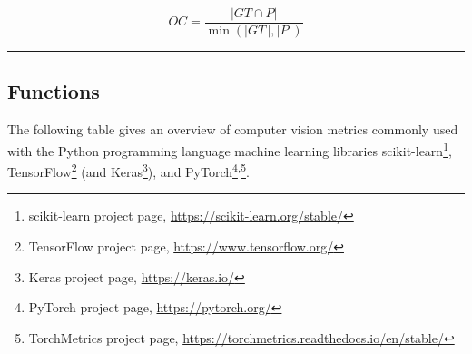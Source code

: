 \documentclass{article}
\begin{document}
\begin{equation}
	\textit{OC} = \dfrac{|\textit{GT} \cap P|}{\min(|\textit{GT}\,|, |P|)}
%
	\label{equation:OC}
\end{equation}

\hrule




\clearpage
\subsection*{Functions}

The following table gives an overview of computer vision metrics commonly used with the Python programming language machine learning libraries scikit-learn\footnote{scikit-learn project page, \url{https://scikit-learn.org/stable/}}, TensorFlow\footnote{TensorFlow project page, \url{https://www.tensorflow.org/}} (and Keras\footnote{Keras project page, \url{https://keras.io/}}), and PyTorch\footnote{PyTorch project page, \url{https://pytorch.org/}}\textsuperscript{,}\footnote{TorchMetrics project page, \url{https://torchmetrics.readthedocs.io/en/stable/}}.
\end{document}
